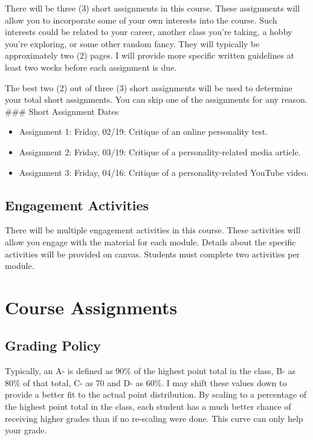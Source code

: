 \documentclass[11pt,]{article}
\begin{document}
There will be three (3) short assignments in this course. These
assignments will allow you to incorporate some of your own interests
into the course. Such interests could be related to your career, another
class you're taking, a hobby you're exploring, or some other random
fancy. They will typically be approximately two (2) pages. I will
provide more specific written guidelines at least two weeks before each
assignment is due.

The best two (2) out of three (3) short assignments will be used to
determine your total short assignments. You can skip one of the
assignments for any reason. \#\#\# Short Assignment Dates

\begin{itemize}
\item
  Assignment 1: Friday, 02/19: Critique of an online personality test.
\item
  Assignment 2: Friday, 03/19: Critique of a personality-related media
  article.
\item
  Assignment 3: Friday, 04/16: Critique of a personality-related YouTube
  video.
\end{itemize}

\hypertarget{engagement-activities}{%
\subsection{Engagement Activities}\label{engagement-activities}}

There will be multiple engagement activities in this course. These
activities will allow you engage with the material for each module.
Details about the specific activities will be provided on canvas.
Students must complete two activities per module.

\hypertarget{course-assignments-1}{%
\section{Course Assignments}\label{course-assignments-1}}

\hypertarget{grading-policy}{%
\subsection{Grading Policy}\label{grading-policy}}

Typically, an A- is defined as 90\% of the highest point total in the
class, B- as 80\% of that total, C- as 70 and D- as 60\%. I may shift
these values down to provide a better fit to the actual point
distribution. By scaling to a percentage of the highest point total in
the class, each student has a much better chance of receiving higher
grades than if no re-scaling were done. This curve can only help your
grade.
\end{document}
